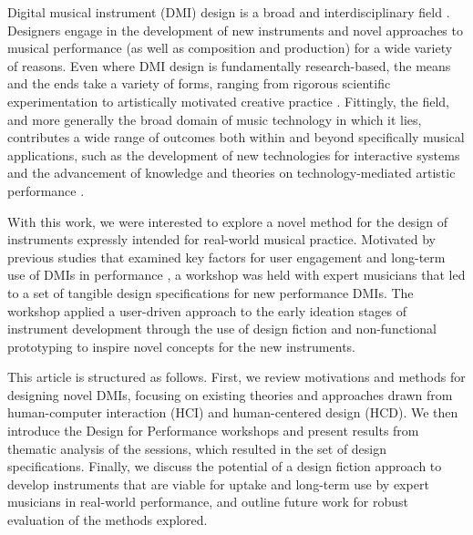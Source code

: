 \documentclass[letterpaper, 12pt]{article}
\begin{document}


Digital musical instrument (DMI) design is a broad and interdisciplinary field \citep{Miranda2006a}. Designers engage in the development of new instruments and novel approaches to musical performance (as well as composition and production) for a wide variety of reasons. Even where DMI design is fundamentally research-based, the means and the ends take a variety of forms, ranging from rigorous scientific experimentation to artistically motivated creative practice \citep{Gurevich2016}. Fittingly, the field, and more generally the broad domain of music technology in which it lies, contributes a wide range of outcomes both within and beyond specifically musical applications, such as the development of new technologies for interactive systems \citep{malloch2018generalized} and the advancement of knowledge and theories on technology-mediated artistic performance \citep{Tahlroglu2020}. 

With this work, we were interested to explore a novel method for the design of instruments expressly intended for real-world musical practice. Motivated by previous studies that examined key factors for user engagement \citep{OBrien2008} and long-term use of DMIs in performance
\citep{Sullivan2021jnmr,Wallis2013},
a workshop was held with expert musicians that led to a set of tangible design specifications for new performance DMIs. The workshop applied a user-driven approach to the early ideation stages of instrument development through the use of design fiction \citep{Blythe2014} and non-functional prototyping \citep{Pigrem2018} to inspire novel concepts for the new instruments. 

This article is structured as follows. First, we review motivations and methods for designing novel DMIs, focusing on existing theories and approaches drawn from human-computer interaction (HCI) and human-centered design (HCD). We then introduce the Design for Performance workshops and present results from thematic analysis of the sessions, which resulted in the set of design specifications. Finally, we discuss the potential of a design fiction approach to develop instruments that are viable for uptake and long-term use by expert musicians in real-world performance, and outline future work for robust evaluation of the methods explored.
\end{document}
